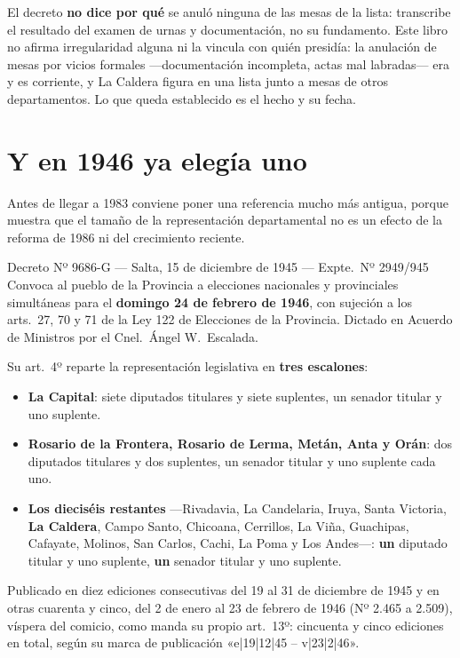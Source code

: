 \begin{cautela}
El decreto \textbf{no dice por qué} se anuló ninguna de las mesas de la lista: transcribe el
resultado del examen de urnas y documentación, no su fundamento. Este libro no afirma
irregularidad alguna ni la vincula con quién presidía: la anulación de mesas por vicios
formales ---documentación incompleta, actas mal labradas--- era y es corriente, y La Caldera
figura en una lista junto a mesas de otros departamentos. Lo que queda establecido es el hecho
y su fecha.
\end{cautela}

\section{Y en 1946 ya elegía uno}

Antes de llegar a 1983 conviene poner una referencia mucho más antigua, porque muestra que el
tamaño de la representación departamental no es un efecto de la reforma de 1986 ni del
crecimiento reciente.

\begin{ficha}{Decreto Nº 9686-G --- Salta, 15 de diciembre de 1945 --- Expte.\ Nº 2949/945}
Convoca al pueblo de la Provincia a elecciones nacionales y provinciales simultáneas para el
\textbf{domingo 24 de febrero de 1946}, con sujeción a los arts.\ 27, 70 y 71 de la Ley 122 de
Elecciones de la Provincia. Dictado en Acuerdo de Ministros por el Cnel.\ Ángel W.\ Escalada.

Su art.\ 4º reparte la representación legislativa en \textbf{tres escalones}:

\begin{itemize}[leftmargin=*,itemsep=1pt]
\item \textbf{La Capital}: siete diputados titulares y siete suplentes, un senador titular y uno suplente.
\item \textbf{Rosario de la Frontera, Rosario de Lerma, Metán, Anta y Orán}: dos diputados titulares y dos suplentes, un senador titular y uno suplente cada uno.
\item \textbf{Los dieciséis restantes} ---Rivadavia, La Candelaria, Iruya, Santa Victoria, \textbf{La Caldera}, Campo Santo, Chicoana, Cerrillos, La Viña, Guachipas, Cafayate, Molinos, San Carlos, Cachi, La Poma y Los Andes---: \textbf{un} diputado titular y uno suplente, \textbf{un} senador titular y uno suplente.
\end{itemize}

Publicado en diez ediciones consecutivas del 19 al 31 de diciembre de 1945 y en otras cuarenta y
cinco, del 2 de enero al 23 de febrero de 1946 (Nº 2.465 a 2.509), víspera del comicio, como manda
su propio art.\ 13º: cincuenta y cinco ediciones en total, según su marca de publicación
«e|19|12|45 -- v|23|2|46».
\end{ficha}

